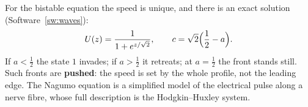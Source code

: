 \documentclass[11pt,a4paper]{article}
\numberwithin{equation}{section}
\theoremstyle{definition}
\begin{document}
For the bistable equation the speed is unique, and there is an exact solution (Software~\ref{sw:waves}):
\[
U(z) = \frac1{1 + e^{z/\sqrt2}}, \qquad c = \sqrt2\Bigl(\frac12 - a\Bigr) .
\]
If $a < \frac12$ the state $1$ invades; if $a > \frac12$ it retreats; at $a = \frac12$ the front stands still. Such fronts are \textbf{pushed}: the speed is set by the whole profile, not the leading edge. The Nagumo equation is a simplified model of the electrical pulse along a nerve fibre, whose full description is the
Hodgkin--Huxley system.

\begin{figure}[H]
\centering
{}
\end{figure}
\end{document}
